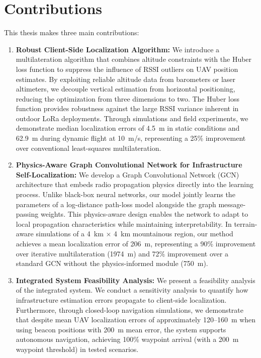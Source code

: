\documentclass[master,final,11pt]{iscs-thesis}
\begin{document}
\section{Contributions}
\label{sec:contributions}

This thesis makes three main contributions:

\begin{enumerate}
    \item \textbf{Robust Client-Side Localization Algorithm:}
    We introduce a multilateration algorithm that combines altitude constraints with the Huber loss function to suppress the influence of RSSI outliers on UAV position estimates.
    By exploiting reliable altitude data from barometers or laser altimeters, we decouple vertical estimation from horizontal positioning, reducing the optimization from three dimensions to two.
    The Huber loss function provides robustness against the large RSSI variance inherent in outdoor LoRa deployments.
    Through simulations and field experiments, we demonstrate median localization errors of 4.5~m in static conditions and 62.9~m during dynamic flight at 10~m/s, representing a 25\% improvement over conventional least-squares multilateration.
    
    \item \textbf{Physics-Aware Graph Convolutional Network for Infrastructure Self-Localization:}
    We develop a Graph Convolutional Network (GCN) architecture that embeds radio propagation physics directly into the learning process.
    Unlike black-box neural networks, our model jointly learns the parameters of a log-distance path-loss model alongside the graph message-passing weights.
    This physics-aware design enables the network to adapt to local propagation characteristics while maintaining interpretability.
    In terrain-aware simulations of a 4~km $\times$ 4~km mountainous region, our method achieves a mean localization error of 206~m, representing a 90\% improvement over iterative multilateration (1974~m) and 72\% improvement over a standard GCN without the physics-informed module (750~m).
    
    \item \textbf{Integrated System Feasibility Analysis:}
    We present a feasibility analysis of the integrated system.
    We conduct a sensitivity analysis to quantify how infrastructure estimation errors propagate to client-side localization.
    Furthermore, through closed-loop navigation simulations, we demonstrate that despite mean UAV localization errors of approximately 120--160~m when using beacon positions with 200~m mean error, the system supports autonomous navigation, achieving 100\% waypoint arrival (with a 200~m waypoint threshold) in tested scenarios.
\end{enumerate}
\end{document}
